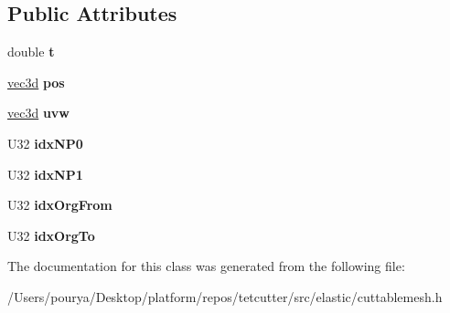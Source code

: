 \subsection*{Public Attributes}
\begin{DoxyCompactItemize}
\item 
\hypertarget{classps_1_1elastic_1_1CuttableMesh_1_1CutEdge_a3e37b3703a46a08c2fe01dfb2d989273}{}double {\bfseries t}\label{classps_1_1elastic_1_1CuttableMesh_1_1CutEdge_a3e37b3703a46a08c2fe01dfb2d989273}

\item 
\hypertarget{classps_1_1elastic_1_1CuttableMesh_1_1CutEdge_a56df08dc8ea6505e5126cf39f2ca7614}{}\hyperlink{classps_1_1base_1_1Vec3}{vec3d} {\bfseries pos}\label{classps_1_1elastic_1_1CuttableMesh_1_1CutEdge_a56df08dc8ea6505e5126cf39f2ca7614}

\item 
\hypertarget{classps_1_1elastic_1_1CuttableMesh_1_1CutEdge_a0c5631fab9c550c695499eaf6c5022cc}{}\hyperlink{classps_1_1base_1_1Vec3}{vec3d} {\bfseries uvw}\label{classps_1_1elastic_1_1CuttableMesh_1_1CutEdge_a0c5631fab9c550c695499eaf6c5022cc}

\item 
\hypertarget{classps_1_1elastic_1_1CuttableMesh_1_1CutEdge_adf8138f36df7a90f168bbb3caaa2823b}{}U32 {\bfseries idx\+N\+P0}\label{classps_1_1elastic_1_1CuttableMesh_1_1CutEdge_adf8138f36df7a90f168bbb3caaa2823b}

\item 
\hypertarget{classps_1_1elastic_1_1CuttableMesh_1_1CutEdge_ab6e2fb20ea2cb70a6b62b49bb16fd2fd}{}U32 {\bfseries idx\+N\+P1}\label{classps_1_1elastic_1_1CuttableMesh_1_1CutEdge_ab6e2fb20ea2cb70a6b62b49bb16fd2fd}

\item 
\hypertarget{classps_1_1elastic_1_1CuttableMesh_1_1CutEdge_ac8f2b02e8c831e13217e5726a188a689}{}U32 {\bfseries idx\+Org\+From}\label{classps_1_1elastic_1_1CuttableMesh_1_1CutEdge_ac8f2b02e8c831e13217e5726a188a689}

\item 
\hypertarget{classps_1_1elastic_1_1CuttableMesh_1_1CutEdge_a92e98f213f57e94d1b085eefbafe4ed6}{}U32 {\bfseries idx\+Org\+To}\label{classps_1_1elastic_1_1CuttableMesh_1_1CutEdge_a92e98f213f57e94d1b085eefbafe4ed6}

\end{DoxyCompactItemize}


The documentation for this class was generated from the following file\+:\begin{DoxyCompactItemize}
\item 
/\+Users/pourya/\+Desktop/platform/repos/tetcutter/src/elastic/cuttablemesh.\+h\end{DoxyCompactItemize}
